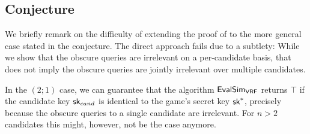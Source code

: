 \subsection{Conjecture}

We briefly remark on the difficulty of extending the proof of 
to the more general case stated in the conjecture. The direct approach fails due to a subtlety:
While we show that the obscure queries are irrelevant on a per-candidate basis, that does not imply the obscure queries 
are jointly irrelevant over multiple candidates.

In the $(2;1)$ case, we can guarantee that the algorithm $\alg{EvalSim}{VRF}$ returns $\top$
if the candidate key $\textup{\textsf{sk}}_{cand}$ is identical to the game's secret key $\textup{\textsf{sk}}^*$,
precisely because the obscure queries to a single candidate are irrelevant.
For $n > 2$ candidates this might, however, not be the case anymore.
